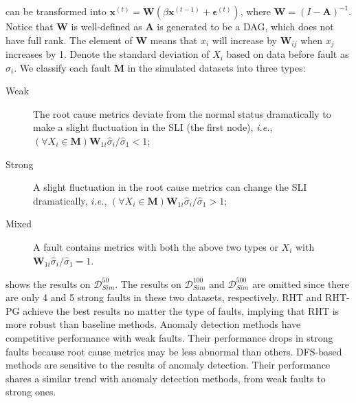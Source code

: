  can be transformed into $\mathbf{x}^{(t)} = \mathbf{W} (\beta \mathbf{x}^{(t-1)} + \mathbf{\epsilon}^{(t)})$, where $\mathbf{W} = (I - \mathbf{A})^{-1}$.
Notice that $\mathbf{W}$ is well-defined as $\mathbf{A}$ is generated to be a DAG, which does not have full rank.
The element of $\mathbf{W}$ means that $x_{i}$ will increase by $\mathbf{W}_{ij}$ when $x_{j}$ increases by 1.
Denote the standard deviation of $X_{i}$ based on data before fault as $\hat{\sigma}_{i}$.
We classify each fault $\mathbf{M}$ in the simulated datasets into three types:
\begin{description}
	\item[Weak] The root cause metrics deviate from the normal status dramatically to make a slight fluctuation in the SLI (the first node), \textit{i.e.}, $\left(\forall X_{i} \in \mathbf{M}\right) \mathbf{W}_{1i} \hat{\sigma}_{i} / \hat{\sigma}_{1} < 1$;
	\item[Strong] A slight fluctuation in the root cause metrics can change the SLI dramatically, \textit{i.e.}, $\left(\forall X_{i} \in \mathbf{M}\right) \mathbf{W}_{1i} \hat{\sigma}_{i} / \hat{\sigma}_{1} > 1$;
	\item[Mixed] A fault contains metrics with both the above two types or $X_{i}$ with $\mathbf{W}_{1i} \hat{\sigma}_{i} / \hat{\sigma}_{1} = 1$.
\end{description}

 shows the results on $\mathcal{D}_{Sim}^{50}$.
The results on $\mathcal{D}_{Sim}^{100}$ and $\mathcal{D}_{Sim}^{500}$ are omitted since there are only 4 and 5 strong faults in these two datasets, respectively.
RHT and RHT-PG achieve the best results no matter the type of faults, implying that RHT is more robust than baseline methods.
Anomaly detection methods have competitive performance with weak faults.
Their performance drops in strong faults because root cause metrics may be less abnormal than others.
DFS-based methods are sensitive to the results of anomaly detection.
Their performance shares a similar trend with anomaly detection methods, from weak faults to strong ones.

